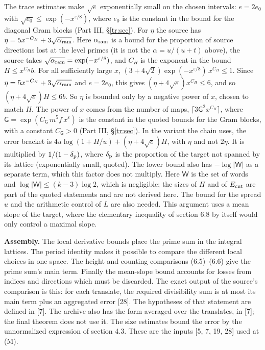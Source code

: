 \documentclass[11pt,letterpaper]{article}
\begin{document}
{The trace estimates make $\sqrt e$ exponentially small on the chosen intervals: $e=2e_0$ with $\sqrt{e_0}\le\exp(-x^{\varepsilon/8})$, where $e_0$ is the constant in the bound for the diagonal Gram blocks (Part III, \S\ref{tr:sec}). For $\eta$ the source has $\eta=5x^{-C_H}+3\sqrt{\alpha_{\rm ram}}$. Here $\alpha_{\rm ram}$ is a bound for the proportion of source directions lost at the level primes (it is not the $\alpha=u/(u+t)$ above), the source takes $\sqrt{\alpha_{\rm ram}}=\exp(-x^{\varepsilon/8})$, and $C_H$ is the exponent in the bound $H\le x^{C_H}b$. For all sufficiently large $x$, $(3+4\sqrt2)\exp(-x^{\varepsilon/8})\,x^{C_H}\le1$. Since $\eta=5x^{-C_H}+3\sqrt{\alpha_{\rm ram}}$ and $e=2e_0$, this gives $(\eta+4\sqrt e)x^{C_H}\le6$, and so $(\eta+4\sqrt e)H\le6b$. So $\eta$ is bounded only by a negative power of $x$, chosen to match $H$. The power of $x$ comes from the number of maps, $\lceil3\mathsf G^2x^{C_H}\rceil$, where $\mathsf G=\exp(C_{\mathsf G}\,m^5f\,x^{\varepsilon})$ is the constant in the quoted bounds for the Gram blocks, with a constant $C_{\mathsf G}>0$ (Part III, \S\ref{tr:sec}). In the variant the chain uses, the error bracket is $4u\log(1+H/u)+(\eta+4\sqrt e)H$, with $\eta$ and not $2\eta$. It is multiplied by $1/(1-\delta_{\rm p})$, where $\delta_{\rm p}$ is the proportion of the target not spanned by its lattice (exponentially small, quoted). The lower bound also has $-\log|\mathsf W|$ as a separate term, which this factor does not multiply. Here $\mathsf W$ is the set of words and $\log|\mathsf W|\le(k-3)\log2$, which is negligible; the sizes of $H$ and of $E_{\rm cnt}$ are part of the quoted statements and are not derived here. The bound for the spread $u$ and the arithmetic control of $L$ are also needed. This argument uses a mean slope of the target, where the elementary inequality of section 6.8 by itself would only control a maximal slope.

\textbf{Assembly.} The local derivative bounds place the prime sum in the integral lattices. The period identity makes it possible to compare the different local choices in one space. The height and counting comparisons (6.5)--(6.6) give the prime sum's main term. Finally the mean-slope bound accounts for losses from indices and directions which must be discarded. The exact output of the source's comparison is this: for each translate, the required divisibility sum is at most its main term plus an aggregated error [28]. The hypotheses of that statement are defined in [7]. The archive also has the form averaged over the translates, in [7]; the final theorem does not use it. The size estimates bound the error by the unnormalized expression of section 4.3. These are the inputs [5, 7, 19, 28] used at (M).

}
\end{document}
